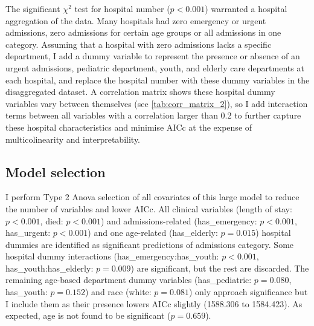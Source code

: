 \documentclass[11pt]{article}
\begin{document}
The significant $\chi^2$ test for hospital number ($p < 0.001 $) warranted a hospital aggregation of the data. Many hospitals had zero emergency or urgent admissions, zero admissions for certain age groups or all admissions in one category. Assuming that a hospital with zero admissions lacks a specific department, I add a dummy variable to represent the presence or absence of an urgent admissions, pediatric department, youth, and elderly care departments at each hospital, and replace the hospital number with these dummy variables in the disaggregated dataset. A correlation matrix shows these hospital dummy variables vary between themselves (see \ref{tab:corr_matrix_2}), so I add interaction terms between all variables with a correlation larger than 0.2 to further capture these hospital characteristics and minimise AICc at the expense of multicolinearity and interpretability.

 \vspace{-0.5cm}
\subsection*{
    \vspace{-0.25cm}
    Model selection
}

I perform Type 2 Anova selection of all covariates of this large model to reduce the number of variables and lower AICc. All clinical variables (length of stay: $p < 0.001$, died: $p < 0.001$) and admissions-related  (has\_emergency: $p < 0.001$, has\_urgent: $p < 0.001$) and one age-related (has\_elderly: $p = 0.015$) hospital dummies are identified as significant predictions of admissions category. Some hospital dummy interactions (has\_emergency:has\_youth: $p < 0.001$, has\_youth:has\_elderly: $p = 0.009$) are significant, but the rest are discarded. The remaining age-based department dummy  variables (has\_pediatric: $p = 0.080$, has\_youth: $p = 0.152$) and race (white: $p = 0.081$) only approach significance but I include them as their presence lowers AICc slightly (1588.306 to 1584.423). As expected, age is not found to be significant ($p = 0.659$).

 \vspace{-0.5cm}
\end{document}
